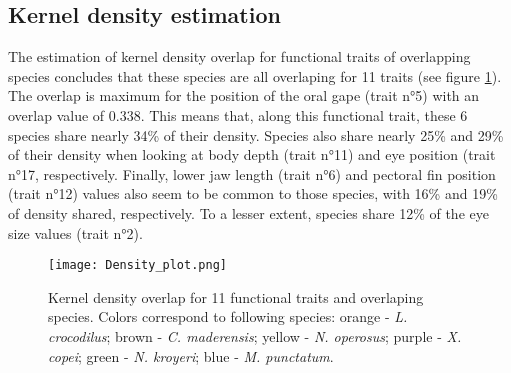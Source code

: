\subsection{Kernel density estimation}
The estimation of kernel density overlap for functional traits of overlapping species concludes that these species are all overlaping for 11 traits (see figure \ref{fig:dpo}). The overlap is maximum for the position of the oral gape (trait n°5) with an overlap value of 0.338. This means that, along this functional trait, these 6 species share nearly 34\% of their density. Species also share nearly 25\% and 29\% of their density when looking at body depth (trait n°11) and eye position (trait n°17, respectively. Finally, lower jaw length (trait n°6) and pectoral fin position (trait n°12) values also seem to be common to those species, with 16\% and 19\% of density shared, respectively. To a lesser extent, species share 12\% of the eye size values (trait n°2).

\begin{figure} [!htbp]
	\begin{center}
		\texttt{[image: Density\_plot.png]}
	\end{center}
	\caption{Kernel density overlap for 11 functional traits and overlaping species. Colors correspond to following species: orange - \textit{L. crocodilus}; brown - \textit{C. maderensis}; yellow - \textit{N. operosus}; purple - \textit{X. copei}; green - \textit{N. kroyeri}; blue - \textit{M. punctatum}.}
	\label{fig:dpo}
\end{figure}